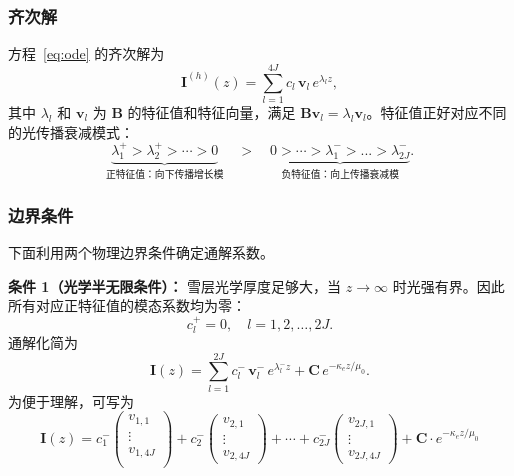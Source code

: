 \documentclass[UTF8,a4paper,12pt]{ctexart}
\begin{document}
\subsubsection{齐次解}
方程~\eqref{eq:ode} 的齐次解为
\begin{equation}
  \mathbf{I}^{(h)}(z) = \sum_{l=1}^{4J}c_l\,\mathbf{v}_l\,e^{\lambda_l z},
  \label{eq:homogeneous}
\end{equation}
其中 $\lambda_l$ 和 $\mathbf{v}_l$ 为 $\mathbf{B}$ 的特征值和特征向量，满足 $\mathbf{B}\mathbf{v}_l=\lambda_l\mathbf{v}_l$。特征值正好对应不同的光传播衰减模式：
\begin{equation}
  \underbrace{\lambda_1^+>\lambda_2^+>\cdots>0}_{\text{正特征值：向下传播增长模}}
  \quad>\quad
  \underbrace{0>\cdots>\lambda_1^->...>\lambda_{2J}^-}_{\text{负特征值：向上传播衰减模}}.
\end{equation}

\subsubsection{边界条件}

下面利用两个物理边界条件确定通解系数。

\textbf{条件 1（光学半无限条件）：} 雪层光学厚度足够大，当 $z\to\infty$ 时光强有界。因此所有对应正特征值的模态系数均为零：
\begin{equation}
  c_l^+=0, \quad l=1,2,\ldots,2J.
  \label{eq:bc1}
\end{equation}
通解化简为
\begin{equation}
  \mathbf{I}(z)
  = \sum_{l=1}^{2J}c_l^-\,\mathbf{v}_l^-\,e^{\lambda_l^- z}
  + \mathbf{C}\,e^{-\kappa_e z/\mu_0}.
  \label{eq:general-solution}
\end{equation}
为便于理解，可写为
\begin{equation}
    \mathbf{I}(z) = \boxed{ c^-_1\begin{pmatrix}
 v_{1,1}  \\
  \vdots \\
  v_{1,4J} \\
  
\end{pmatrix}+c^-_2\begin{pmatrix}
 v_{2,1}  \\
   \vdots\\
  v_{2,4J}
\end{pmatrix}+\cdots+c^-_{2J}\begin{pmatrix}
  v_{2J,1} \\
  \vdots \\
  v_{2J,4J}
\end{pmatrix}}+ \mathbf{C}\cdot e^{-\kappa_e z/\mu_0}
\end{equation}
\end{document}
